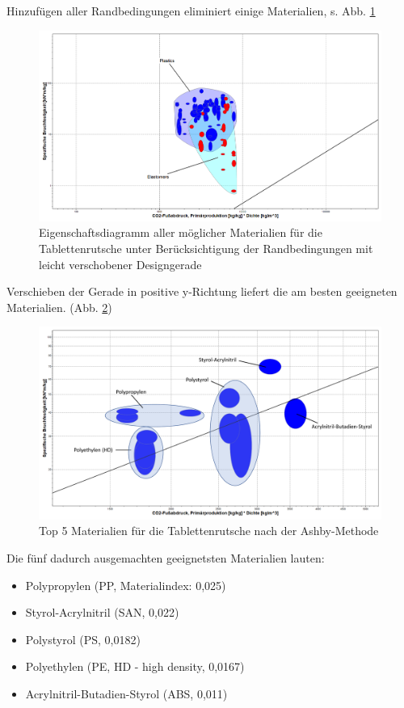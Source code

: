 Hinzufügen aller Randbedingungen eliminiert einige Materialien, s. Abb. \ref{fig:ces_3_2_2}\\
\begin{figure}[H]
	\centering
	\includegraphics[width=1.0\linewidth]{chapter/Bilder/3_2_2}
	\caption{Eigenschaftsdiagramm aller möglicher Materialien für die Tablettenrutsche unter Berücksichtigung der Randbedingungen mit leicht verschobener Designgerade}
	\label{fig:ces_3_2_2}
\end{figure}
Verschieben der Gerade in positive y-Richtung liefert die am besten geeigneten Materialien. (Abb. \ref{fig:ces_3_2_3})\\
\begin{figure}[H]
	\centering
	\includegraphics[width=1.0\linewidth]{chapter/Bilder/3_2_3}
	\caption{Top 5 Materialien für die Tablettenrutsche nach der Ashby-Methode}
	\label{fig:ces_3_2_3}
\end{figure}
Die fünf dadurch ausgemachten geeignetsten Materialien lauten:
\begin{itemize}
	\item[1)] Polypropylen (PP, Materialindex: 0,025)
	\item[2)] Styrol-Acrylnitril (SAN, 0,022) 
	\item[3)] Polystyrol (PS, 0,0182)
	\item[4)] Polyethylen (PE, HD - high density, 0,0167)
	\item[5)] Acrylnitril-Butadien-Styrol (ABS, 0,011)
\end{itemize}
